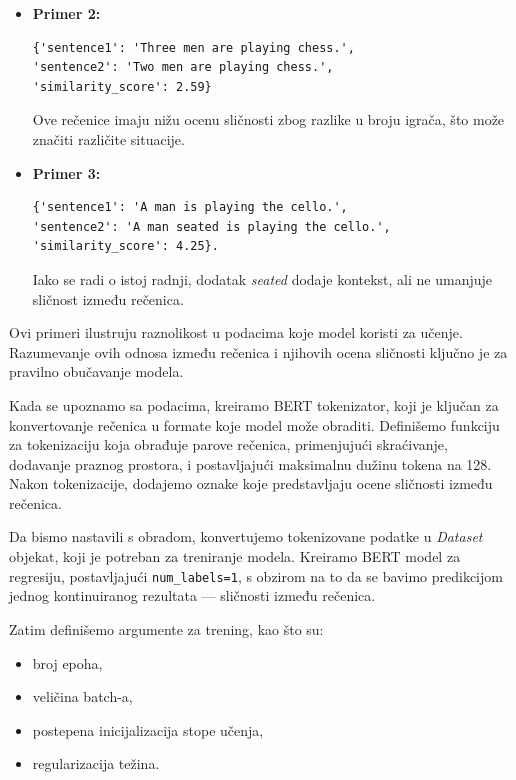 \documentclass{article}
\begin{document}
\begin{itemize} 
    \item \textbf{Primer 2:}
    \begin{lstlisting}
{'sentence1': 'Three men are playing chess.',
'sentence2': 'Two men are playing chess.',
'similarity_score': 2.59}
    \end{lstlisting}
    Ove rečenice imaju nižu ocenu sličnosti zbog razlike u broju igrača, što može značiti različite situacije.
\end{itemize}

\begin{itemize} 
    \item \textbf{Primer 3:}
    \begin{lstlisting}
{'sentence1': 'A man is playing the cello.',
'sentence2': 'A man seated is playing the cello.',
'similarity_score': 4.25}.
    \end{lstlisting}
    Iako se radi o istoj radnji, dodatak \textit{seated} dodaje kontekst, ali ne umanjuje sličnost između rečenica. 
\end{itemize}

Ovi primeri ilustruju raznolikost u podacima koje model koristi za učenje. Razumevanje ovih odnosa između rečenica i njihovih ocena sličnosti ključno je za pravilno obučavanje modela.

Kada se upoznamo sa podacima, kreiramo BERT tokenizator, koji je ključan za konvertovanje rečenica u formate koje model može obraditi. Definišemo funkciju za tokenizaciju koja obrađuje parove rečenica, primenjujući skraćivanje, dodavanje praznog prostora, i postavljajući maksimalnu dužinu tokena na 128. Nakon tokenizacije, dodajemo oznake koje predstavljaju ocene sličnosti između rečenica.

Da bismo nastavili s obradom, konvertujemo tokenizovane podatke u \textit{Dataset} objekat, koji je potreban za treniranje modela. Kreiramo BERT model za regresiju, postavljajući \texttt{num\_labels=1}, s obzirom na to da se bavimo predikcijom jednog kontinuiranog rezultata — sličnosti između rečenica.

\vspace{1em}
Zatim definišemo argumente za trening, kao što su: \begin{itemize} \item broj epoha, \item veličina batch-a, \item postepena inicijalizacija stope učenja, \item regularizacija težina. \end{itemize}
\end{document}
